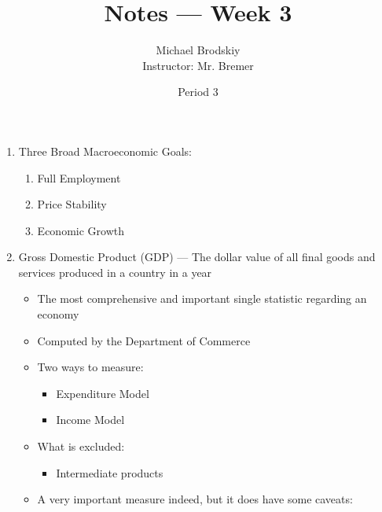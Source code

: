 \documentclass[12pt]{article}
\title{Notes — Week 3}
\date{Period 3}
\author{Michael Brodskiy\\ \small Instructor: Mr. Bremer}
\begin{document}
\maketitle

\begin{enumerate}

  \item Three Broad Macroeconomic Goals:

    \begin{enumerate}

      \item Full Employment

      \item Price Stability

      \item Economic Growth

    \end{enumerate}

  \item Gross Domestic Product (GDP) — The dollar value of all final goods and services produced in a country in a year

    \begin{itemize}

      \item The most comprehensive and important single statistic regarding an economy

      \item Computed by the Department of Commerce

      \item Two ways to measure:

        \begin{itemize}

          \item Expenditure Model

          \item Income Model

        \end{itemize}

      \item What is excluded:

        \begin{itemize}

          \item Intermediate products

        \end{itemize}

      \item A very important measure indeed, but it does have some caveats:


\end{itemize}
\end{enumerate}
\end{document}
